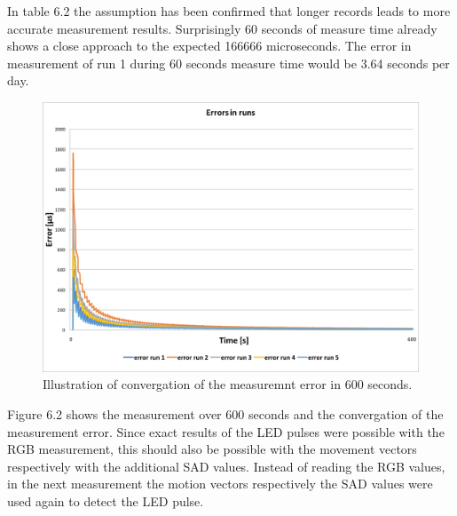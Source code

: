 \documentclass[12pt, a4paper]{report}
\begin{document}
    In table 6.2 the assumption has been confirmed that longer records leads to more accurate measurement results.
    Surprisingly 60 seconds of measure time already shows a close approach to the expected 166666 microseconds. The error in measurement of run 1 during 60 seconds measure time would be 3.64 seconds per day.

    \begin{figure}[H]
      \includegraphics[scale=0.5]{Images/errors_600sec.png}
  
    \caption{Illustration of convergation of the measuremnt error in 600 seconds.}
    \end{figure}

    Figure 6.2 shows the measurement over 600 seconds and the convergation of the measurement error.
    Since exact results of the LED pulses were possible with the RGB measurement, this should also be possible with the movement vectors respectively with the additional SAD values.
    Instead of reading the RGB values, in the next measurement the motion vectors respectively the SAD values were used again to detect the LED pulse.
\end{document}
